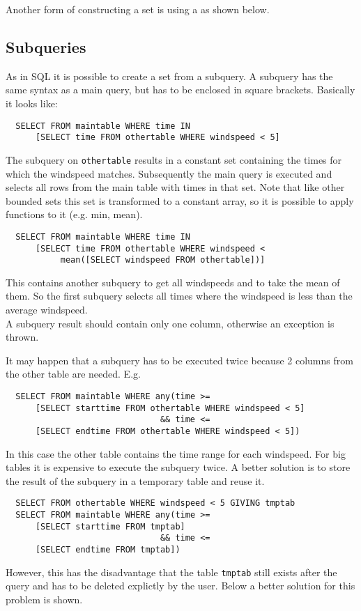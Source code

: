 Another form of constructing a set is using a
 as shown below.

\subsection{\label{TAQL:SUBQUERIES}Subqueries}
As in SQL it is possible to create a set from a subquery. A
subquery has the same syntax as a main query, but has to be
enclosed in square brackets. Basically it looks like:
\begin{verbatim}
  SELECT FROM maintable WHERE time IN
      [SELECT time FROM othertable WHERE windspeed < 5]
\end{verbatim}
The subquery on \texttt{othertable} results in a constant set
containing the times
for which the windspeed matches. Subsequently the main query
is executed and selects all rows from the main table with times in
that set.
Note that like other bounded sets this set is transformed to a
constant array, so it is possible to apply functions to it (e.g. min, mean).
\begin{verbatim}
  SELECT FROM maintable WHERE time IN
      [SELECT time FROM othertable WHERE windspeed <
           mean([SELECT windspeed FROM othertable])]
\end{verbatim}
This contains another subquery to get all windspeeds and
to take the mean of them. So the first subquery selects all times
where the windspeed is less than the average windspeed.
\\A subquery result should contain only one column, otherwise
an exception is thrown.

It may happen that a subquery has to be executed twice because
2 columns from the other table are needed. E.g.
\begin{verbatim}
  SELECT FROM maintable WHERE any(time >=
      [SELECT starttime FROM othertable WHERE windspeed < 5]
                               && time <=
      [SELECT endtime FROM othertable WHERE windspeed < 5])
\end{verbatim}
In this case the other table contains the time range for each windspeed.
For big tables it is expensive to execute the subquery twice.
A better solution
is to store the result of the subquery in a temporary table and reuse it.
\begin{verbatim}
  SELECT FROM othertable WHERE windspeed < 5 GIVING tmptab
  SELECT FROM maintable WHERE any(time >=
      [SELECT starttime FROM tmptab]
                               && time <=
      [SELECT endtime FROM tmptab])
\end{verbatim}
However, this has the disadvantage that the table \texttt{tmptab}
still exists after the query and has to be deleted explictly by the
user. Below a better solution for this problem is shown.

